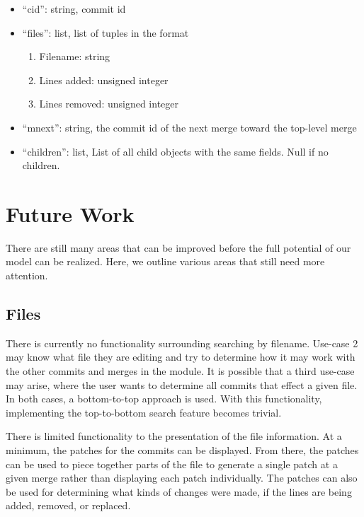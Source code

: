 \documentclass[conference, draftclsnofoot]{IEEEtran}
\begin{document}
\begin{itemize}
        \item ``cid'': string, commit id
        \item ``files'': list, list of tuples in the format
                \begin{enumerate}
                        \item Filename: string
                        \item Lines added: unsigned integer
                        \item Lines removed: unsigned integer
                \end{enumerate}
        \item ``mnext'': string, the commit id of the next merge toward the
                top-level merge
        \item ``children'': list, List of all child objects with the same
                fields. Null if no children.
\end{itemize}

\section{Future Work}

There are still many areas that can be improved before the full potential of our
model can be realized. Here, we outline various areas that still need more
attention.

\subsection{Files}

There is currently no functionality surrounding searching by filename. Use-case 2
may know what file they are editing and try to determine how it may work with the
other commits and merges in the module. It is possible that a third use-case may
arise, where the user wants to determine all commits that effect a given file. In
both cases, a bottom-to-top approach is used. With this functionality, implementing
the top-to-bottom search feature becomes trivial.

There is limited functionality to the presentation of the file information. At a
minimum, the patches for the commits can be displayed. From there, the patches can
be used to piece together parts of the file to generate a single patch at a given
merge rather than displaying each patch individually. The patches can also be used
for determining what kinds of changes were made, if the lines are being added,
removed, or replaced.
\end{document}

